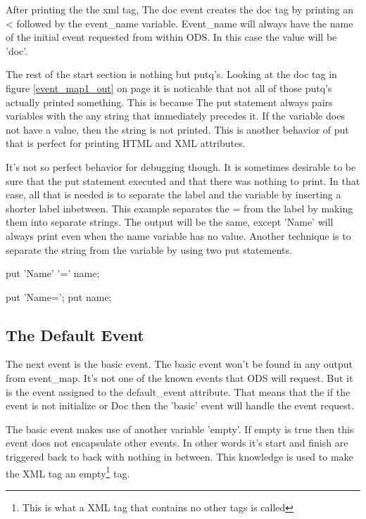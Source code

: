 After printing the the xml tag, The doc event creates the
doc tag by printing an < followed by the event\_name variable.
Event\_name will always have the name of the initial event
requested from within ODS.  In this case the value will be 'doc'.

The rest of the start section is nothing but putq's.  
Looking at the doc tag in figure \ref{event_map1_out}
on page \pageref{event_map1_out} it is noticable that not all
of those putq's actually printed something.  This is because
The put statement always pairs variables with the any string that
immediately precedes it.  If the variable does not have a value,
then the string is not printed.  This is another behavior of put
that is perfect for printing HTML and XML attributes.

It's not so perfect behavior for debugging though.  It is sometimes
desirable to be sure that the put statement executed and that there
was nothing to print.  In that case, all that is needed is to separate
the label and the variable by inserting a shorter label inbetween.
This example separates the = from the label by making them into separate
strings.  The output will be the same, except 'Name' will always print
even when the name variable has no value.  Another technique is to separate
the string from the variable by using two put statements.

\begin{sfvcode}
    put 'Name' '=' name;

    put 'Name=';
    put name;
\end{sfvcode}

\subsection{The Default Event}
The next event is the basic event.  The basic event won't be
found in any output from event\_map.  It's not one of the known 
events that ODS will request.  But it is the event assigned to
the default\_event attribute.  That means that the if the event
is not initialize or Doc then the 'basic' event will handle the
event request.

The basic event makes use of another variable 'empty'.  If empty
is true then this event does not encapsulate other
events.  In other words it's start and finish are triggered 
back to back with nothing in between.  This knowledge is used
to make the XML tag an empty\footnote{This is what a XML tag that contains 
no other tags is called} tag.

